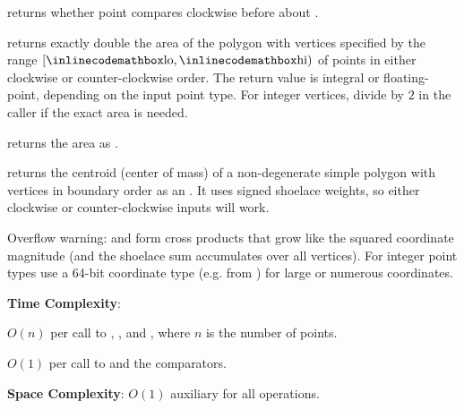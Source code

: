 \begin{compactitem}
  \item {} returns whether point  compares clockwise before  about .
  \item {} returns exactly double the area of the polygon with vertices specified by the range $[{\inlinecodemath{lo}}, {\inlinecodemath{hi}})$ of points in either clockwise or counter-clockwise order. The return value is integral or floating-point, depending on the input point type. For integer vertices, divide by $2$ in the caller if the exact area is needed.
  \item {} returns the area as .
  \item {} returns the centroid (center of mass) of a non-degenerate simple polygon with vertices in boundary order as an . It uses signed shoelace weights, so either clockwise or counter-clockwise inputs will work.
\end{compactitem}

Overflow warning:  and  form cross products that grow like the squared coordinate magnitude (and the shoelace sum accumulates over all vertices). For integer point types use a 64-bit coordinate type (e.g.  from ) for large or numerous coordinates.

\textbf{Time Complexity}:
\begin{compactitem}
  \item $O(n)$ per call to , , and , where $n$ is the number of points.
  \item $O(1)$ per call to  and the comparators.
\end{compactitem}

\textbf{Space Complexity}: $O(1)$ auxiliary for all operations.

